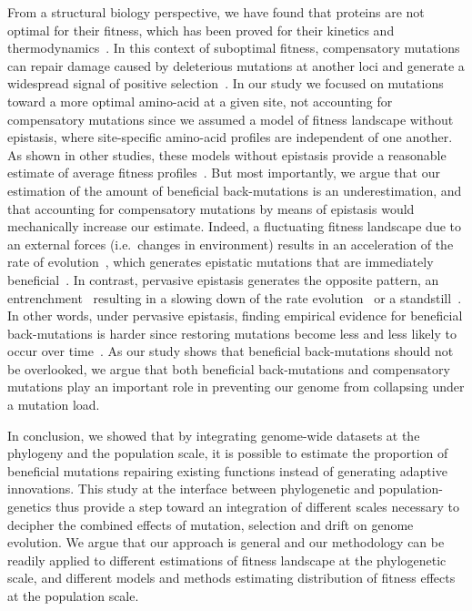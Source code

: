 \documentclass{article}
\begin{document}
    From a structural biology perspective, we have found that proteins are not optimal for their fitness, which has been proved for their kinetics and thermodynamics~\cite{hartl_compensatory_1996, taverna_why_2002, goldstein_evolution_2011}.
    In this context of suboptimal fitness, compensatory mutations can repair damage caused by deleterious mutations at another loci and generate a widespread signal of positive selection~\cite{hartl_compensatory_1996, pollock_strong_2014, starr_epistasis_2016}.
    In our study we focused on mutations toward a more optimal amino-acid at a given site, not accounting for compensatory mutations since we assumed a model of fitness landscape without epistasis, where site-specific amino-acid profiles are independent of one another.
    As shown in other studies, these models without epistasis provide a reasonable estimate of average fitness profiles~\cite{youssef_consequences_2020}.
    But most importantly, we argue that our estimation of the amount of beneficial back-mutations is an underestimation, and that accounting for compensatory mutations by means of epistasis would mechanically increase our estimate.
    Indeed, a fluctuating fitness landscape due to an external forces (i.e.~changes in environment) results in an acceleration of the rate of evolution~\cite{rodrigue_detecting_2017, rodrigue_bayesian_2021}, which generates epistatic mutations that are immediately beneficial~\cite{gong_epistatically_2014}.
    In contrast, pervasive epistasis generates the opposite pattern, an entrenchment~\cite{goldstein_evolutionary_2004, goldstein_nonadaptive_2015} resulting in a slowing down of the rate evolution~\cite{rodrigue_detecting_2017, patel_epistasis_2022} or a standstill~\cite{youssef_evolution_2022}.
    In other words, under pervasive epistasis, finding empirical evidence for beneficial back-mutations is harder since restoring mutations become less and less likely to occur over time~\cite{goldstein_nonadaptive_2015, goldstein_sequence_2017, park_epistatic_2022}.
    As our study shows that beneficial back-mutations should not be overlooked, we argue that both beneficial back-mutations and compensatory mutations play an important role in preventing our genome from collapsing under a mutation load.

    In conclusion, we showed that by integrating genome-wide datasets at the phylogeny and the population scale, it is possible to estimate the proportion of beneficial mutations repairing existing functions instead of generating adaptive innovations.
    This study at the interface between phylogenetic and population-genetics thus provide a step toward an integration of different scales necessary to decipher the combined effects of mutation, selection and drift on genome evolution.
    We argue that our approach is general and our methodology can be readily applied to different estimations of fitness landscape at the phylogenetic scale, and different models and methods estimating distribution of fitness effects at the population scale.
\end{document}
